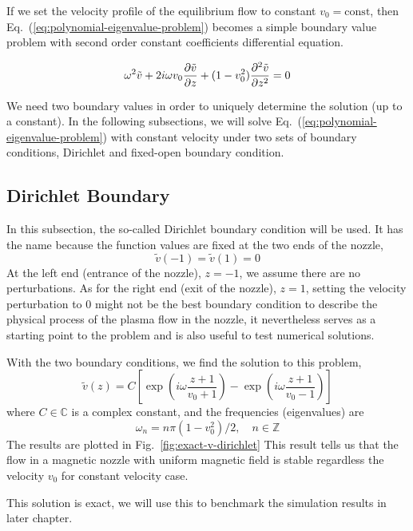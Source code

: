 If we set the velocity profile of the equilibrium flow to constant $v_0=\text{const}$, then Eq.~(\ref{eq:polynomial-eigenvalue-problem}) becomes a simple boundary value problem with second order constant coefficients differential equation.

\begin{equation} \label{eq:constant-v-problem-dirichlet}
	\omega^2\tilde{v} + 2i\omega v_0\pdv{\tilde{v}}{z} + (1-v_0^2)\pdv[2]{\tilde{v}}{z} = 0
\end{equation}

We need two boundary values in order to uniquely determine the solution (up to a constant). In the following subsections, we will solve Eq.~(\ref{eq:polynomial-eigenvalue-problem}) with constant velocity under two sets of boundary conditions, Dirichlet and fixed-open boundary condition.

\subsection{Dirichlet Boundary}
In this subsection, the so-called Dirichlet boundary condition will be used. It has the name because the function values are fixed at the two ends of the nozzle,
\[ \tilde{v}(-1) = \tilde{v}(1) = 0 \]
At the left end (entrance of the nozzle), $z=-1$, we assume there are no perturbations. As for the right end (exit of the nozzle), $z=1$, setting the velocity perturbation to 0 might not be the best boundary condition to describe the physical process of the plasma flow in the nozzle, it nevertheless serves as a starting point to the problem and is also useful to test numerical solutions.

With the two boundary conditions, we find the solution to this problem,
\begin{equation} \label{eq:constant-v-solution-dirichlet}
	\tilde{v}(z) = C\left[ \exp\left(i\omega\frac{z+1}{v_0+1}\right) - \exp\left(i\omega\frac{z+1}{v_0-1}\right) \right]
\end{equation}
where $C\in\mathbb{C}$ is a complex constant, and the frequencies (eigenvalues) are
\begin{equation}
	\omega_n = n\pi(1-v_0^2)/2,\quad n\in\mathbb{Z}
	\label{eq:eigvals-constant-v-dirichlet}
\end{equation}
The results are plotted in Fig.~\ref{fig:exact-v-dirichlet} This result tells us that the flow in a magnetic nozzle with uniform magnetic field is stable regardless the velocity $v_0$ for constant velocity case.

This solution is exact, we will use this to benchmark the simulation results in later chapter.

